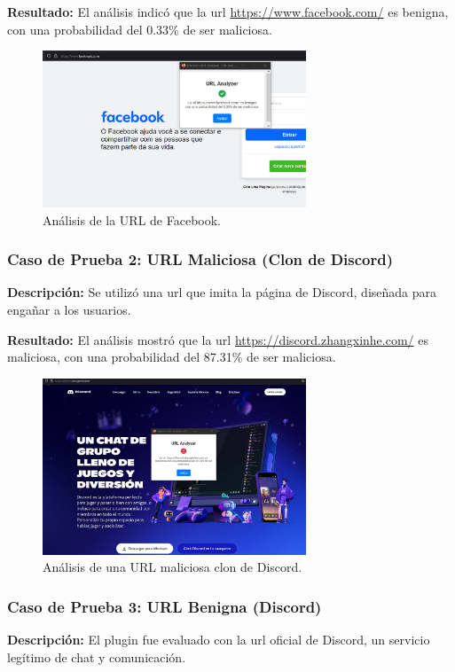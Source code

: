 \textbf{Resultado:}
El análisis indicó que la \gls{url} \url{https://www.facebook.com/} es benigna, con una probabilidad del 0.33\% de ser maliciosa.

\begin{figure}[H]
    \centering
    \includegraphics[width=0.7\textwidth]{image1.png}
    \caption{Análisis de la URL de Facebook.}
    \label{fig:facebook}
\end{figure}

\subsubsection*{Caso de Prueba 2: URL Maliciosa (Clon de Discord)}
\textbf{Descripción:}
Se utilizó una \gls{url} que imita la página de Discord, diseñada para engañar a los usuarios.

\textbf{Resultado:}
El análisis mostró que la \gls{url} \url{https://discord.zhangxinhe.com/} es maliciosa, con una probabilidad del 87.31\% de ser maliciosa.



\begin{figure}[H]
    \centering
    \includegraphics[width=0.7\textwidth]{image2.png}
    \caption{Análisis de una URL maliciosa clon de Discord.}
    \label{fig:discord_malicious}
\end{figure}

\subsubsection*{Caso de Prueba 3: URL Benigna (Discord)}
\textbf{Descripción:}
El plugin fue evaluado con la \gls{url} oficial de Discord, un servicio legítimo de chat y comunicación.

